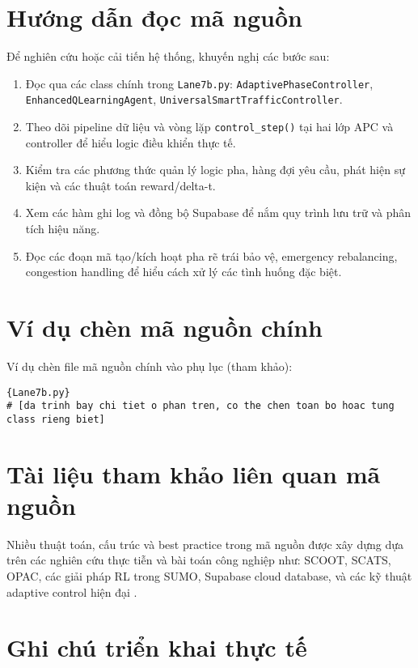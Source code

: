 \section{Hướng dẫn đọc mã nguồn}

Để nghiên cứu hoặc cải tiến hệ thống, khuyến nghị các bước sau:
\begin{enumerate}
    \item Đọc qua các class chính trong \texttt{Lane7b.py}: \texttt{AdaptivePhaseController}, \texttt{EnhancedQLearningAgent}, \texttt{UniversalSmartTrafficController}.
    \item Theo dõi pipeline dữ liệu và vòng lặp \texttt{control\_step()} tại hai lớp APC và controller để hiểu logic điều khiển thực tế.
    \item Kiểm tra các phương thức quản lý logic pha, hàng đợi yêu cầu, phát hiện sự kiện và các thuật toán reward/delta-t.
    \item Xem các hàm ghi log và đồng bộ Supabase để nắm quy trình lưu trữ và phân tích hiệu năng.
    \item Đọc các đoạn mã tạo/kích hoạt pha rẽ trái bảo vệ, emergency rebalancing, congestion handling để hiểu cách xử lý các tình huống đặc biệt.
\end{enumerate}

\section{Ví dụ chèn mã nguồn chính}

Ví dụ chèn file mã nguồn chính vào phụ lục (tham khảo):
\begin{lstlisting}[style=py,caption={Bộ điều khiển Lane7b.py}]{Lane7b.py}
# [da trinh bay chi tiet o phan tren, co the chen toan bo hoac tung class rieng biet]
\end{lstlisting}

\section{Tài liệu tham khảo liên quan mã nguồn}

Nhiều thuật toán, cấu trúc và best practice trong mã nguồn được xây dựng dựa trên các nghiên cứu thực tiễn và bài toán công nghiệp như: SCOOT, SCATS, OPAC, các giải pháp RL trong SUMO, Supabase cloud database, và các kỹ thuật adaptive control hiện đại \cite{Hunt1981, Lowrie1990, Mirchandani2001, Eom2020, Wei2019, Shaikh2022}.

\section{Ghi chú triển khai thực tế}

